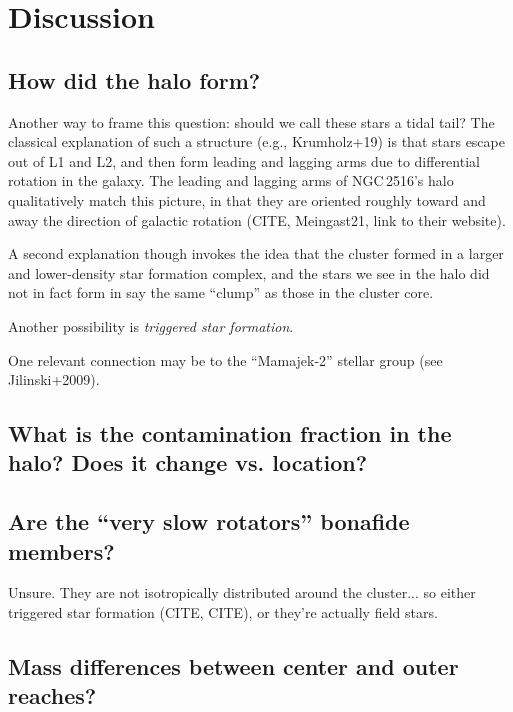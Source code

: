 \documentclass[12pt,twocolumn,tighten]{aastex63}
\begin{document}
\section{Discussion}
\label{sec:discussion}

\subsection{How did the halo form?}
Another way to frame this question: should we call these stars a tidal
tail?
The classical explanation of such a structure (e.g., Krumholz+19) is
that stars escape out of L1 and L2, and then form leading and lagging
arms due to differential rotation in the galaxy.
The leading and lagging arms of NGC\,2516's halo qualitatively
match this picture, in that they are oriented roughly toward and away
the direction of galactic rotation (CITE, Meingast21, link to their
website).

A second explanation though invokes
the idea that the cluster formed in a larger and lower-density star
formation complex, and the stars we see in the halo did not in fact
form in say the same ``clump'' as those in the cluster core.

Another possibility is {\it triggered star formation}.

One relevant connection may be to the ``Mamajek-2'' stellar group
(see Jilinski+2009).



\subsection{What is the contamination fraction in the halo? Does it change vs. location?}

\subsection{Are the ``very slow rotators'' bonafide members?}
Unsure. They are not isotropically distributed around the
cluster... so either triggered star formation (CITE, CITE), or they're
actually field stars.

\subsection{Mass differences between center and outer reaches?}
\end{document}
